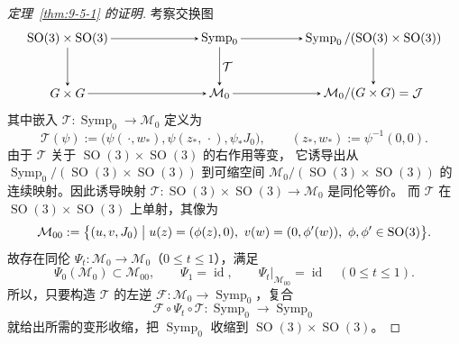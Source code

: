 \begin{proof}[定理~\ref{thm:9-5-1} 的证明]
考察交换图
\[
\begin{tikzpicture}[baseline=(current bounding box.center),>=stealth,
  every node/.style={inner sep=2pt}]
  \node (a) at (0,0) {$\operatorname{SO}(3)\times\operatorname{SO}(3)$};
  \node (b) at (4.25,0) {$\operatorname{Symp}_0$};
  \node (c) at (8.55,0)
    {$\operatorname{Symp}_0/(\operatorname{SO}(3)\times\operatorname{SO}(3))$};
  \node (d) at (0,-1.55) {$G\times G$};
  \node (e) at (4.25,-1.55) {$\mathcal M_0$};
  \node (f) at (8.55,-1.55) {$\mathcal M_0/(G\times G)=\mathcal J$};
  \draw[->] (a) -- (b);
  \draw[->] (b) -- (c);
  \draw[->] (d) -- (e);
  \draw[->] (e) -- (f);
  \draw[->] (a) -- (d);
  \draw[->] (b) -- node[right] {$\mathcal T$} (e);
  \draw[->] (c) -- (f);
\end{tikzpicture}
\]
其中嵌入 $\mathcal T:\operatorname{Symp}_0\to\mathcal M_0$ 定义为
\[
  \mathcal T(\psi)
  :=\bigl(\psi(\,·,w_*),\psi(z_*,\,·),\psi_*J_0\bigr),
  \qquad(z_*,w_*):=\psi^{-1}(0,0).
\]
由于 $\mathcal T$ 关于 $\operatorname{SO}(3)\times\operatorname{SO}(3)$ 的右作用等变，
它诱导出从
$\operatorname{Symp}_0/(\operatorname{SO}(3)\times\operatorname{SO}(3))$ 到可缩空间
$\mathcal M_0/(\operatorname{SO}(3)\times\operatorname{SO}(3))$ 的连续映射。因此诱导映射
$\mathcal T:\operatorname{SO}(3)\times\operatorname{SO}(3)\to\mathcal M_0$ 是同伦等价。
而 $\mathcal T$ 在 $\operatorname{SO}(3)\times\operatorname{SO}(3)$ 上单射，其像为
\[
  \mathcal M_{00}:=\bigl\{(u,v,J_0)\bigm|
  u(z)=(\phi(z),0),\ v(w)=(0,\phi'(w)),\
  \phi,\phi'\in\operatorname{SO}(3)\bigr\}.
\]
故存在同伦 $\Psi_t:\mathcal M_0\to\mathcal M_0$（$0\le t\le1$），满足
\[
  \Psi_0(\mathcal M_0)\subset\mathcal M_{00},
  \qquad \Psi_1=\operatorname{id},
  \qquad \Psi_t|_{\mathcal M_{00}}=\operatorname{id}\quad(0\le t\le1).
\]
所以，只要构造 $\mathcal T$ 的左逆
$\mathcal F:\mathcal M_0\to\operatorname{Symp}_0$，复合
\[
  \mathcal F\circ\Psi_t\circ\mathcal T:
  \operatorname{Symp}_0\longrightarrow\operatorname{Symp}_0
\]
就给出所需的变形收缩，把 $\operatorname{Symp}_0$ 收缩到
$\operatorname{SO}(3)\times\operatorname{SO}(3)$。


\end{proof}
